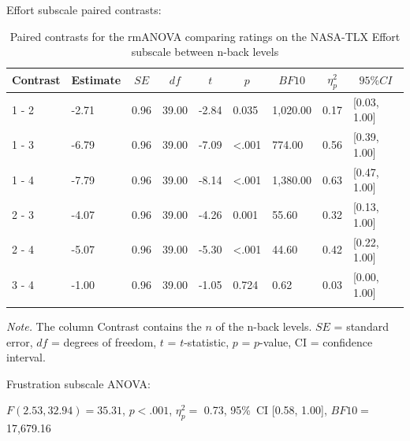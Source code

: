 \documentclass[
  man,floatsintext]{apa6}
\begin{document}
Effort subscale paired contrasts:

\begin{table}[H]

\begin{center}
\begin{threeparttable}

\caption{\label{tab:unnamed-chunk-6}Paired contrasts for the rmANOVA comparing ratings on the NASA-TLX Effort subscale between n-back levels}

\begin{tabular}{lllllllll}
\toprule
Contrast & \multicolumn{1}{c}{Estimate} & \multicolumn{1}{c}{$SE$} & \multicolumn{1}{c}{$df$} & \multicolumn{1}{c}{$t$} & \multicolumn{1}{c}{$p$} & \multicolumn{1}{c}{$BF10$} & \multicolumn{1}{c}{$\eta_{p}^{2}$} & \multicolumn{1}{c}{$95\% CI$}\\
\midrule
1 - 2 & -2.71 & 0.96 & 39.00 & -2.84 & 0.035 & 1,020.00 & 0.17 & {}[0.03, 1.00]\\
1 - 3 & -6.79 & 0.96 & 39.00 & -7.09 & <.001 & 774.00 & 0.56 & {}[0.39, 1.00]\\
1 - 4 & -7.79 & 0.96 & 39.00 & -8.14 & <.001 & 1,380.00 & 0.63 & {}[0.47, 1.00]\\
2 - 3 & -4.07 & 0.96 & 39.00 & -4.26 & 0.001 & 55.60 & 0.32 & {}[0.13, 1.00]\\
2 - 4 & -5.07 & 0.96 & 39.00 & -5.30 & <.001 & 44.60 & 0.42 & {}[0.22, 1.00]\\
3 - 4 & -1.00 & 0.96 & 39.00 & -1.05 & 0.724 & 0.62 & 0.03 & {}[0.00, 1.00]\\
\bottomrule
\addlinespace
\end{tabular}

\begin{tablenotes}[para]
\normalsize{\textit{Note.} The column Contrast contains the $n$ of the n-back levels. $SE$ = standard error, $df$ = degrees of freedom, $t$ = $t$-statistic, $p$ = $p$-value, CI = confidence interval.}
\end{tablenotes}

\end{threeparttable}
\end{center}

\end{table}

\newpage

Frustration subscale ANOVA:

\(F(2.53, 32.94) = 35.31\), \(p < .001\), \(\eta_{p}^{2}=\) 0.73, 95\%~CI {[}0.58, 1.00{]}, \(BF10=\) 17,679.16
\end{document}
